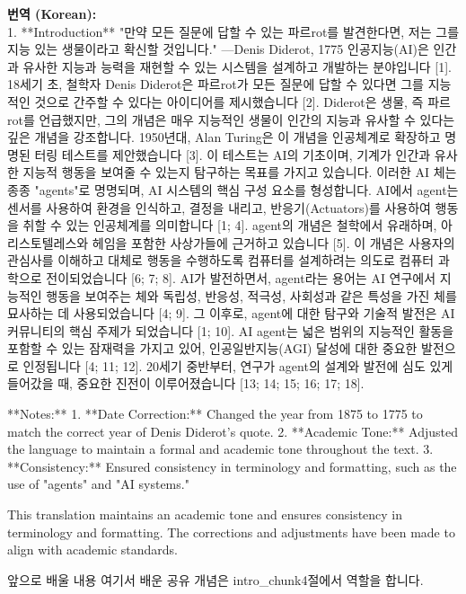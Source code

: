 \documentclass[12pt,a4paper]{article}
\begin{document}
\begin{mdframed}[style=ko]
\noindent\textbf{\small 번역 (Korean):}\\[2pt]
1. **Introduction**
   "만약 모든 질문에 답할 수 있는 파르rot를 발견한다면, 저는 그를 지능 있는 생물이라고 확신할 것입니다." —Denis Diderot, 1775
   인공지능(AI)은 인간과 유사한 지능과 능력을 재현할 수 있는 시스템을 설계하고 개발하는 분야입니다 [1]. 18세기 초, 철학자 Denis Diderot은 파르rot가 모든 질문에 답할 수 있다면 그를 지능적인 것으로 간주할 수 있다는 아이디어를 제시했습니다 [2]. Diderot은 생물, 즉 파르rot를 언급했지만, 그의 개념은 매우 지능적인 생물이 인간의 지능과 유사할 수 있다는 깊은 개념을 강조합니다. 1950년대, Alan Turing은 이 개념을 인공체계로 확장하고 명명된 터링 테스트를 제안했습니다 [3]. 이 테스트는 AI의 기초이며, 기계가 인간과 유사한 지능적 행동을 보여줄 수 있는지 탐구하는 목표를 가지고 있습니다. 이러한 AI 체는 종종 "agents"로 명명되며, AI 시스템의 핵심 구성 요소를 형성합니다. AI에서 agent는 센서를 사용하여 환경을 인식하고, 결정을 내리고, 반응기(Actuators)를 사용하여 행동을 취할 수 있는 인공체계를 의미합니다 [1; 4]. agent의 개념은 철학에서 유래하며, 아리스토텔레스와 헤임을 포함한 사상가들에 근거하고 있습니다 [5]. 이 개념은 사용자의 관심사를 이해하고 대체로 행동을 수행하도록 컴퓨터를 설계하려는 의도로 컴퓨터 과학으로 전이되었습니다 [6; 7; 8]. AI가 발전하면서, agent라는 용어는 AI 연구에서 지능적인 행동을 보여주는 체와 독립성, 반응성, 적극성, 사회성과 같은 특성을 가진 체를 묘사하는 데 사용되었습니다 [4; 9]. 그 이후로, agent에 대한 탐구와 기술적 발전은 AI 커뮤니티의 핵심 주제가 되었습니다 [1; 10]. AI agent는 넓은 범위의 지능적인 활동을 포함할 수 있는 잠재력을 가지고 있어, 인공일반지능(AGI) 달성에 대한 중요한 발전으로 인정됩니다 [4; 11; 12]. 20세기 중반부터, 연구가 agent의 설계와 발전에 심도 있게 들어갔을 때, 중요한 진전이 이루어졌습니다 [13; 14; 15; 16; 17; 18].

**Notes:**
1. **Date Correction:** Changed the year from 1875 to 1775 to match the correct year of Denis Diderot's quote.
2. **Academic Tone:** Adjusted the language to maintain a formal and academic tone throughout the text.
3. **Consistency:** Ensured consistency in terminology and formatting, such as the use of "agents" and "AI systems."

This translation maintains an academic tone and ensures consistency in terminology and formatting. The corrections and adjustments have been made to align with academic standards.

\begin{previewbox}{앞으로 배울 내용}
  여기서 배운 공유 개념은 intro_chunk4절에서 역할을 합니다.
\end{previewbox}

\end{mdframed}
\vspace{1em}
\end{document}
